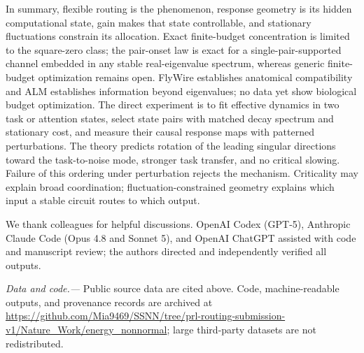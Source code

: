 \documentclass[
  aps,prl,reprint,superscriptaddress,nofootinbib,longbibliography,floatfix,
  amsmath,amssymb
]{revtex4-2}
\begin{document}
In summary, flexible routing is the phenomenon, response geometry is its hidden
computational state, gain makes that state controllable, and stationary
fluctuations constrain its allocation.  Exact finite-budget concentration is
limited to the square-zero class; the pair-onset law is exact for a
single-pair-supported channel embedded in any stable real-eigenvalue spectrum,
whereas generic finite-budget
optimization remains open.  FlyWire establishes anatomical compatibility and
ALM establishes information beyond eigenvalues; no data yet show biological
budget optimization.  The direct experiment is to
fit effective dynamics in two task or attention states, select state pairs with
matched decay spectrum and stationary cost, and measure their causal response
maps with patterned perturbations.  The theory predicts rotation of the leading
singular directions toward the task-to-noise mode, stronger task transfer, and
no critical slowing.  Failure of this ordering under perturbation rejects the
mechanism.  Criticality may explain broad coordination;
fluctuation-constrained geometry explains which input a stable circuit routes
to which output.

\begin{acknowledgments}
We thank colleagues for helpful discussions.  OpenAI Codex (GPT-5), Anthropic
Claude Code (Opus 4.8 and Sonnet 5), and OpenAI ChatGPT assisted with code and
manuscript review; the authors directed and independently verified all outputs.
\end{acknowledgments}

\emph{Data and code.---} Public source data are cited above.  Code,
machine-readable outputs, and provenance records are archived at
\url{https://github.com/Mia9469/SSNN/tree/prl-routing-submission-v1/Nature_Work/energy_nonnormal};
large third-party datasets are not redistributed.

\nocite{zhangabbott2000,semedo2019,costacurta2024,christodoulou2022,
jovanovic2005,hu2022,zavatoneveth2026,wakhloo2026,trefethen2005,
neftci2019,chau2025}


\end{document}
